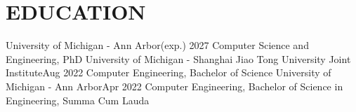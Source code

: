 \section{EDUCATION}
  \resumeSubHeadingListStart
  
    \resumeSubheading
    {University of Michigan - Ann Arbor}{(exp.) 2027 }
    {Computer Science and Engineering, PhD}{}
        \resumeItemListStart
        \resumeItemListEnd
    \resumeSubheading
    {University of Michigan - Shanghai Jiao Tong University Joint Institute}{Aug 2022}
    {Computer Engineering, Bachelor of Science}{}
    \resumeSubheading
    {University of Michigan - Ann Arbor}{Apr 2022}
    {Computer Engineering, Bachelor of Science in Engineering, Summa Cum Lauda}{}

        
  \resumeSubHeadingListEnd